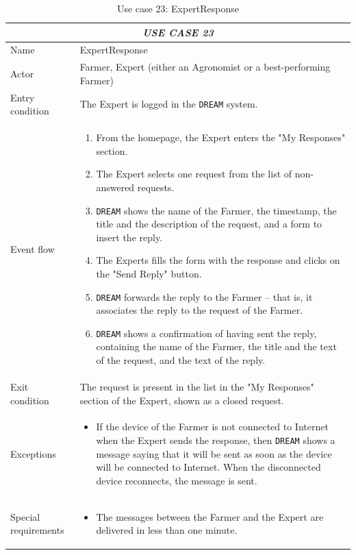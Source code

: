 \documentclass{article}
\begin{document}
\centering
\begin{longtable}{|p{3.5cm}|m{8cm}|}
\caption{Use case 23: ExpertResponse}
 \label{uc23}
 \hline
 \multicolumn{2}{|c|}{\cellcolor{white}\emph{USE CASE 23}} \\
 \endfirsthead
 \endhead
 \endfoot
 \endlastfoot
 \hline
 Name & ExpertResponse\\
 \hline
 Actor & Farmer, Expert (either an Agronomist or a best-performing Farmer)\\
 \hline
 Entry condition & The Expert is logged in the \verb|DREAM| system.\\
 \hline
 Event flow & \begin{enumerate}
    \item From the homepage, the Expert enters the "My Responses" section.
    \item The Expert selects one request from the list of non-answered requests.
    \item \verb|DREAM| shows the name of the Farmer, the timestamp, the title and the description of the request, and a form to insert the reply.
    \item The Experts fills the form with the response and clicks on the "Send Reply" button.
    \item \verb|DREAM| forwards the reply to the Farmer – that is, it associates the reply to the request of the Farmer.
    \item \verb|DREAM| shows a confirmation of having sent the reply, containing the name of the Farmer, the title and the text of the request, and the text of the reply.
 \end{enumerate}\\
 \hline
 Exit condition & The request is present in the list in the "My Responses" section of the Expert, shown as a closed request.\\
 \hline
 Exceptions & \begin{itemize}
    \item If the device of the Farmer is not connected to Internet when the Expert sends the response, then \verb|DREAM| shows a message saying that it will be sent as soon as the device will be connected to Internet. When the disconnected device reconnects, the message is sent.
 \end{itemize}\\
 \hline
 Special requirements & \begin{itemize}
     \item The messages between the Farmer and the Expert are delivered in less than one minute.
 \end{itemize}\\
 \hline
\end{longtable}
\end{document}
